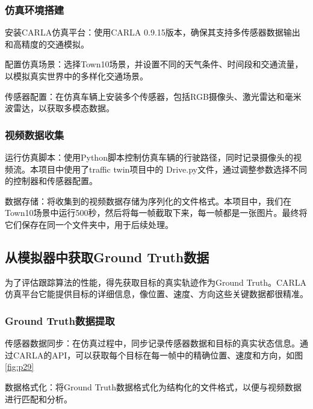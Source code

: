 \subsubsection{仿真环境搭建}

安装CARLA仿真平台：使用CARLA 0.9.15版本，确保其支持多传感器数据输出和高精度的交通模拟。

配置仿真场景：选择Town10场景，并设置不同的天气条件、时间段和交通流量，以模拟真实世界中的多样化交通场景。

传感器配置：在仿真车辆上安装多个传感器，包括RGB摄像头、激光雷达和毫米波雷达，以获取多模态数据。

\subsubsection{视频数据收集}

运行仿真脚本：使用Python脚本控制仿真车辆的行驶路径，同时记录摄像头的视频流。本项目中使用了traffic twin项目中的 Drive.py文件，通过调整参数选择不同的控制器和传感器配置。

数据存储：将收集到的视频数据存储为序列化的文件格式。本项目中，我们在Town10场景中运行500秒，然后将每一帧截取下来，每一帧都是一张图片。最终将它们保存在同一个文件夹中，用于后续处理。



\subsection{从模拟器中获取Ground Truth数据}

为了评估跟踪算法的性能，得先获取目标的真实轨迹作为Ground Truth。CARLA仿真平台它能提供目标的详细信息，像位置、速度、方向这些关键数据都很精准。


\subsubsection{Ground Truth数据提取}

传感器数据同步：在仿真过程中，同步记录传感器数据和目标的真实状态信息。通过CARLA的API，可以获取每个目标在每一帧中的精确位置、速度和方向，如图\ref{fig:p29}

数据格式化：将Ground Truth数据格式化为结构化的文件格式，以便与视频数据进行匹配和分析。





